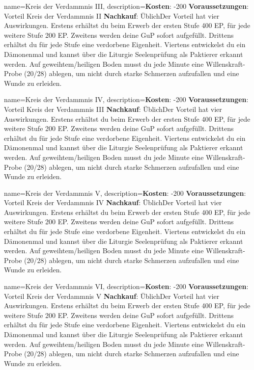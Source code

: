 {
    name={Kreis der Verdammnis III},
    description={\textbf{Kosten}: -200 \textbf{Voraussetzungen}: Vorteil Kreis der Verdammnis II \textbf{Nachkauf}: Üblich\newline Der Vorteil hat vier Auswirkungen. Erstens erhältst du beim Erwerb der ersten Stufe 400 EP, für jede weitere Stufe 200 EP. Zweitens werden deine GuP sofort aufgefüllt. Drittens erhältst du für jede Stufe eine verdorbene Eigenheit. Viertens entwickelst du ein Dämonenmal und kannst über die Liturgie Seelenprüfung als Paktierer erkannt werden. Auf geweihtem/heiligen Boden musst du jede Minute eine Willenskraft-Probe (20/28) ablegen, um nicht durch starke Schmerzen aufzufallen und eine Wunde zu erleiden.}
}


{
    name={Kreis der Verdammnis IV},
    description={\textbf{Kosten}: -200 \textbf{Voraussetzungen}: Vorteil Kreis der Verdammnis III \textbf{Nachkauf}: Üblich\newline Der Vorteil hat vier Auswirkungen. Erstens erhältst du beim Erwerb der ersten Stufe 400 EP, für jede weitere Stufe 200 EP. Zweitens werden deine GuP sofort aufgefüllt. Drittens erhältst du für jede Stufe eine verdorbene Eigenheit. Viertens entwickelst du ein Dämonenmal und kannst über die Liturgie Seelenprüfung als Paktierer erkannt werden. Auf geweihtem/heiligen Boden musst du jede Minute eine Willenskraft-Probe (20/28) ablegen, um nicht durch starke Schmerzen aufzufallen und eine Wunde zu erleiden.}
}


{
    name={Kreis der Verdammnis V},
    description={\textbf{Kosten}: -200 \textbf{Voraussetzungen}: Vorteil Kreis der Verdammnis IV \textbf{Nachkauf}: Üblich\newline Der Vorteil hat vier Auswirkungen. Erstens erhältst du beim Erwerb der ersten Stufe 400 EP, für jede weitere Stufe 200 EP. Zweitens werden deine GuP sofort aufgefüllt. Drittens erhältst du für jede Stufe eine verdorbene Eigenheit. Viertens entwickelst du ein Dämonenmal und kannst über die Liturgie Seelenprüfung als Paktierer erkannt werden. Auf geweihtem/heiligen Boden musst du jede Minute eine Willenskraft-Probe (20/28) ablegen, um nicht durch starke Schmerzen aufzufallen und eine Wunde zu erleiden.}
}


{
    name={Kreis der Verdammnis VI},
    description={\textbf{Kosten}: -200 \textbf{Voraussetzungen}: Vorteil Kreis der Verdammnis V \textbf{Nachkauf}: Üblich\newline Der Vorteil hat vier Auswirkungen. Erstens erhältst du beim Erwerb der ersten Stufe 400 EP, für jede weitere Stufe 200 EP. Zweitens werden deine GuP sofort aufgefüllt. Drittens erhältst du für jede Stufe eine verdorbene Eigenheit. Viertens entwickelst du ein Dämonenmal und kannst über die Liturgie Seelenprüfung als Paktierer erkannt werden. Auf geweihtem/heiligen Boden musst du jede Minute eine Willenskraft-Probe (20/28) ablegen, um nicht durch starke Schmerzen aufzufallen und eine Wunde zu erleiden.}
}


